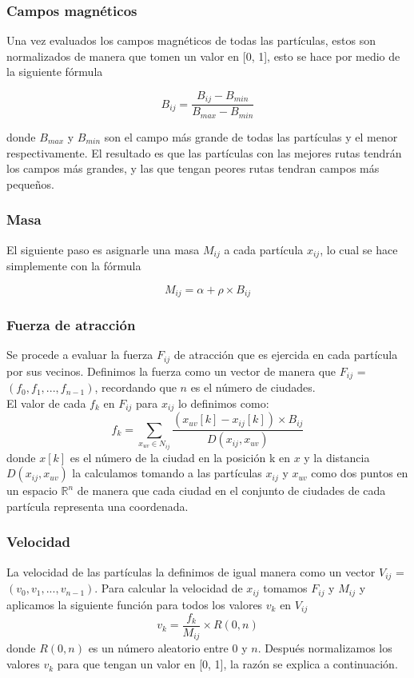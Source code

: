 \documentclass[12pt]{article}
\begin{document}
\subsubsection*{Campos magnéticos}
Una vez evaluados los campos magnéticos de todas las partículas, estos son normalizados de manera que tomen un valor en [0, 1], esto se hace por medio de la siguiente fórmula

\begin{equation}
  B_{ij} = \frac{B_{ij} - B_{min}} {B_{max} - B_{min}} 
\end{equation}

\noindent donde $B_{max}$ y $B_{min}$ son el campo más grande de todas las partículas y el menor respectivamente. El resultado es que las partículas con las mejores rutas tendrán los campos más grandes, y las que tengan peores rutas tendran campos más pequeños.

\subsubsection*{Masa}
El siguiente paso es asignarle una masa $M_{ij}$ a cada partícula $x_{ij}$, lo cual se hace simplemente con la fórmula

\begin{equation}
  M_{ij} = \alpha + \rho \times B_{ij}
\end{equation}

\subsubsection*{Fuerza de atracción}
Se procede a evaluar la fuerza $F_{ij}$ de atracción que es ejercida en cada partícula por sus vecinos. Definimos la fuerza como un vector de manera que $F_{ij}$ = $(f_0, f_1, ... , f_{n - 1})$,  recordando que $n$ es el número de ciudades. \\
El valor de cada $f_k$ en $F_{ij}$ para $x_{ij}$ lo definimos como:
\begin{equation}
  f_k = \sum_{x_{uv} \in N_{ij}}\frac{(x_{uv}[k] - x_{ij}[k]) \times B_{ij}}{D(x_{ij}, x_{uv})}
\end{equation}
donde $x[k]$ es el número de la ciudad en la posición k en $x$ y la distancia $D(x_{ij}, x_{uv})$ la calculamos tomando a las partículas $x_{ij}$ y $x_{uv}$ como dos puntos en un espacio $\mathbb{R}^n$ de manera que cada ciudad en el conjunto de ciudades de cada partícula representa una coordenada.

\subsubsection*{Velocidad}\label{sec:vel}
La velocidad de las partículas la definimos de igual manera como un vector $V_{ij}$ = $(v_0, v_1,...,v_{n - 1})$. Para calcular la velocidad de $x_{ij}$ tomamos $F_{ij}$ y $M_{ij}$ y aplicamos la siguiente función para todos los valores $v_k$ en $V_{ij}$
\begin{equation}
  v_k = \frac{f_k}{M_{ij}} \times R(0, n)
\end{equation}
donde $R(0, n)$ es un número aleatorio entre 0 y $n$. Después normalizamos los valores $v_k$ para que tengan un valor en [0, 1], la razón se explica a continuación.
\end{document}
